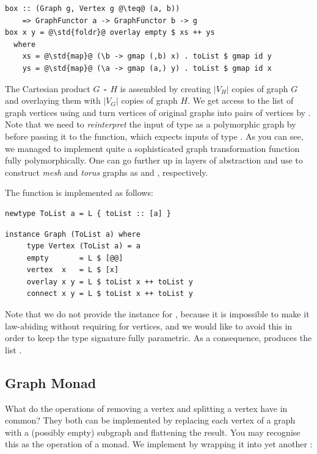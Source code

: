 \begin{verbatim}
box :: (Graph g, Vertex g @\teq@ (a, b))
    => GraphFunctor a -> GraphFunctor b -> g
box x y = @\std{foldr}@ overlay empty $ xs ++ ys
  where
    xs = @\std{map}@ (\b -> gmap (,b) x) . toList $ gmap id y
    ys = @\std{map}@ (\a -> gmap (a,) y) . toList $ gmap id x
\end{verbatim}

The Cartesian product $G~~\square~~H$ is assembled by creating $|V_H|$ copies
of graph $G$ and overlaying them with $|V_G|$ copies of graph $H$. We get
access to the list of graph vertices using  and turn vertices of
original graphs into pairs of vertices by . Note that we need to
\emph{reinterpret} the input of type  as a polymorphic graph
by  before passing it to the  function, which expects
inputs of type . As you can see, we managed to implement quite
a sophisticated graph transformation function  fully polymorphically.
One can go further up in layers of abstraction and use  to construct
\emph{mesh} and \emph{torus} graphs as
 and
, respectively.

The  function is implemented as follows:

\begin{verbatim}
newtype ToList a = L { toList :: [a] }
\end{verbatim}
\vspace{1mm}
\begin{verbatim}
instance Graph (ToList a) where
     type Vertex (ToList a) = a
     empty       = L $ [@@]
     vertex  x   = L $ [x]
     overlay x y = L $ toList x ++ toList y
     connect x y = L $ toList x ++ toList y
\end{verbatim}

\noindent
Note that we do not provide the  instance for , because it
is impossible to make it law-abiding without requiring  for vertices,
and we would like to avoid this in order to keep the  type signature
fully parametric. As a consequence,  produces the
list \hs{[1,1]}.

\subsection{Graph Monad}\label{sub-monad}

What do the operations of removing a vertex and splitting a vertex have in common?
They both can be implemented by replacing each vertex of a graph with a (possibly empty)
subgraph and flattening the result. You may recognise this as the  operation
of a monad. We implement  by wrapping it into yet another :


